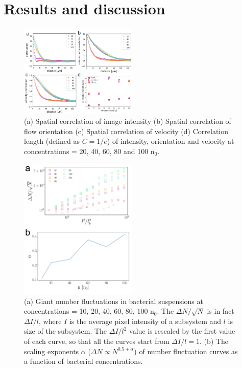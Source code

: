 \documentclass[twocolumn,aps,pre,amsmath,amssymb,floatfix,longbibliography]{revtex4-1}
\begin{document}
\section{Results and discussion}

\begin{figure}[!]
\begin{center}
\includegraphics[width=0.5\textwidth]{GNF-figures-2.png}
\caption[]{(a) Spatial correlation of image intensity (b) Spatial correlation of flow orientation (c) Spatial correlation of velocity (d) Correlation length (defined as $C=1/e$) of intensity, orientation and velocity at concentrations = 20, 40, 60, 80 and 100 n$_0$.}
\label{fig:2}
\end{center}
\end{figure}

\begin{figure}[!]
\begin{center}
\includegraphics[width=0.5\textwidth]{GNF-figures-3.png}
\caption[]{(a) Giant number fluctuations in bacterial suspensions at concentrations = 10, 20, 40, 60, 80, 100 n$_0$. The $\Delta N/\sqrt{N}$ is in fact $\Delta I/l$, where $I$ is the average pixel intensity of a subsystem and $l$ is size of the subsystem. The $\Delta I/l^2$ value is rescaled by the first value of each curve, so that all the curves start from $\Delta I/l=1$. (b) The scaling exponents $\alpha$ ($\Delta N \propto N^{0.5+\alpha}$) of number fluctuation curves as a function of bacterial concentrations.}
\label{fig:3}
\end{center}
\end{figure}
\end{document}
